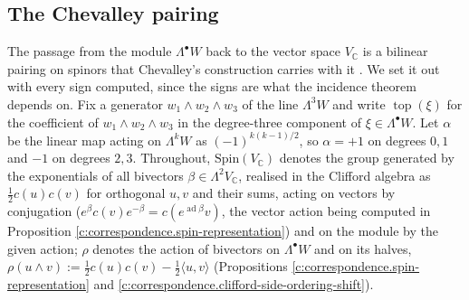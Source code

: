 \documentclass[11pt]{article}
\theoremstyle{definition}
\theoremstyle{plain}
\providecommand{\C}{}\renewcommand{\C}{\mathbb{C}}
\providecommand{\ip}{}\renewcommand{\ip}[2]{\langle #1, #2\rangle}
\begin{document}
\subsection*{The Chevalley pairing}
\label{c:note.correspondence.setting-chevalley-pairing}
The passage from the module $\Lambda^\bullet W$ back to the vector space $V_\C$ is a bilinear pairing on spinors that Chevalley's construction carries with it \cite{Chevalley54}. We set it out with every sign computed, since the signs are what the incidence theorem depends on. Fix a generator $w_1 \wedge w_2 \wedge w_3$ of the line $\Lambda^3 W$ and write $\operatorname{top}(\xi)$ for the coefficient of $w_1\wedge w_2\wedge w_3$ in the degree-three component of $\xi \in \Lambda^\bullet W$. Let $\alpha$ be the linear map acting on $\Lambda^k W$ as $(-1)^{k(k-1)/2}$, so $\alpha = +1$ on degrees $0, 1$ and $-1$ on degrees $2, 3$. Throughout, $\mathrm{Spin}(V_\C)$ denotes the group generated by the exponentials of all bivectors $\beta \in \Lambda^2 V_\C$, realised in the Clifford algebra as $\tfrac12 c(u)c(v)$ for orthogonal $u, v$ and their sums, acting on vectors by conjugation ($e^{\beta} c(v) e^{-\beta} = c(e^{\operatorname{ad}\beta} v)$, the vector action being computed in Proposition \ref{c:correspondence.spin-representation}) and on the module by the given action; $\rho$ denotes the action of bivectors on $\Lambda^\bullet W$ and on its halves, $\rho(u\wedge v) := \tfrac12 c(u)c(v) - \tfrac12\ip{u}{v}$ (Propositions \ref{c:correspondence.spin-representation} and \ref{c:correspondence.clifford-side-ordering-shift}).
\end{document}
